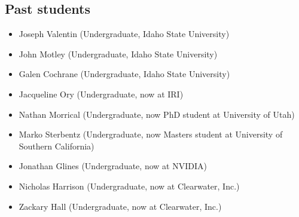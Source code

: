 \documentclass[margin,line]{res}
\begin{document}
\begin{resume}
\begin{LONG}
\section{\sc Past students}
\begin{itemize}[label={},leftmargin=0pt]
  \setlength\itemsep{0em}
  \item Joseph Valentin (Undergraduate, Idaho State University)
  \item John Motley (Undergraduate, Idaho State University)
  \item Galen Cochrane (Undergraduate, Idaho State University)
  \item Jacqueline Ory (Undergraduate, now at IRI)
  \item Nathan Morrical (Undergraduate, now PhD student at University of Utah)
  \item Marko Sterbentz (Undergraduate, now Masters student at University of Southern California)
  \item Jonathan Glines (Undergraduate, now at NVIDIA)
  \item Nicholas Harrison (Undergraduate, now at Clearwater, Inc.)
  \item Zackary Hall (Undergraduate, now at Clearwater, Inc.)
\end{itemize}


\end{LONG}
\end{resume}
\end{document}
